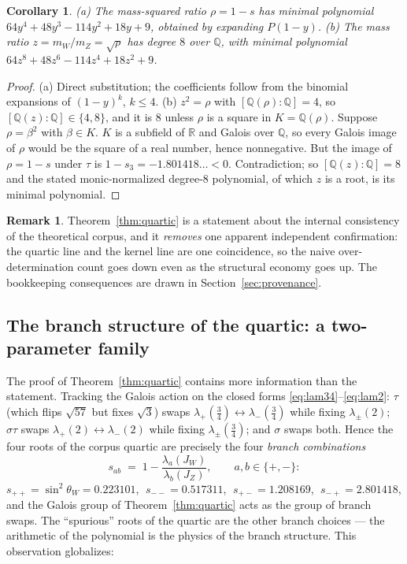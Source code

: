 \documentclass[11pt,a4paper]{article}
\newtheorem{corollary}{Corollary}
\theoremstyle{definition}
\newtheorem{remark}{Remark}
\newcommand{\swsq}{\sin^2\theta_W}
\begin{document}
\begin{corollary}
\label{cor:rho}
(a) The mass-squared ratio $\rho=1-s$ has minimal polynomial
$64y^4+48y^3-114y^2+18y+9$, obtained by expanding $P(1-y)$.
(b) The mass ratio $z=m_W/m_Z=\sqrt{\rho}$ has degree $8$ over
$\mathbb{Q}$, with minimal polynomial $64z^8+48z^6-114z^4+18z^2+9$.
\end{corollary}

\begin{proof}
(a) Direct substitution; the coefficients follow from the binomial
expansions of $(1-y)^k$, $k\le4$.
(b) $z^2=\rho$ with $[\mathbb{Q}(\rho):\mathbb{Q}]=4$, so
$[\mathbb{Q}(z):\mathbb{Q}]\in\{4,8\}$, and it is $8$ unless $\rho$ is a
square in $K=\mathbb{Q}(\rho)$. Suppose $\rho=\beta^2$ with $\beta\in K$.
$K$ is a subfield of $\mathbb{R}$ and Galois over $\mathbb{Q}$, so every
Galois image of $\rho$ would be the square of a real number, hence
nonnegative. But the image of $\rho=1-s$ under $\tau$ is
$1-s_3=-1.801418\ldots<0$. Contradiction; so
$[\mathbb{Q}(z):\mathbb{Q}]=8$ and the stated monic-normalized degree-$8$
polynomial, of which $z$ is a root, is its minimal polynomial.
\end{proof}

\begin{remark}
Theorem~\ref{thm:quartic} is a statement about the internal consistency of
the theoretical corpus, and it \emph{removes} one apparent independent
confirmation: the quartic line and the kernel line are one coincidence, so
the naive over-determination count goes down even as the structural economy
goes up. The bookkeeping consequences are drawn in
Section~\ref{sec:provenance}.
\end{remark}

\subsection{The branch structure of the quartic: a two-parameter family}
\label{sec:branchquartic}

The proof of Theorem~\ref{thm:quartic} contains more information than the
statement. Tracking the Galois action on the closed forms
\eqref{eq:lam34}--\eqref{eq:lam2}: $\tau$ (which flips $\sqrt{57}$ but fixes
$\sqrt3$) swaps $\lambda_+(\tfrac34)\leftrightarrow\lambda_-(\tfrac34)$
while fixing $\lambda_\pm(2)$; $\sigma\tau$ swaps
$\lambda_+(2)\leftrightarrow\lambda_-(2)$ while fixing
$\lambda_\pm(\tfrac34)$; and $\sigma$ swaps both. Hence the four roots of
the corpus quartic are precisely the four \emph{branch combinations}
\[
s_{ab}\;=\;1-\frac{\lambda_a(J_W)}{\lambda_b(J_Z)},
\qquad a,b\in\{+,-\}:
\]
$s_{++}=\swsq=0.223101$, $\;s_{--}=0.517311$, $\;s_{+-}=1.208169$,
$\;s_{-+}=2.801418$, and the Galois group of Theorem~\ref{thm:quartic} acts
as the group of branch swaps. The ``spurious'' roots of the quartic are
the other branch choices --- the arithmetic of the polynomial is the
physics of the branch structure. This observation globalizes:
\end{document}

